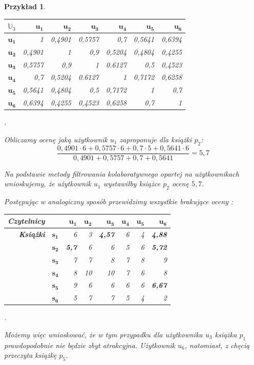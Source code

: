 \documentclass[12pt,a4paper]{report}
\newtheorem{przyklad}{Przykład}[chapter]
\begin{document}
\begin{przyklad}
\begin{center}
\begin{tabular}{|r|r|r|r|r|r|r|}
$\mathbb{U}_3$ & $\mathbf{u_1}$ & $\mathbf{u_2}$ & $\mathbf{u_3}$ & $\mathbf{u_4}$ & $\mathbf{u_5}$ & $\mathbf{u_6}$ \\
\hline
$\mathbf{u_1}$ & 1 & 0,4901 & 0,5757 & 0,7 & 0,5641 & 0,6394 \\
\hline
$\mathbf{u_2}$ & 0,4901 & 1 & 0,9 & 0,5204 & 0,4804 & 0,4255 \\
\hline
$\mathbf{u_3}$ & 0,5757 & 0,9 & 1 & 0.6127 & 0,5 & 0,4523 \\
\hline
$\mathbf{u_4}$ & 0,7 & 0,5204 & 0.6127 & 1 & 0,7172 & 0,6258 \\ 
\hline 
$\mathbf{u_5}$ & 0,5641 & 0,4804 & 0,5 & 0,7172 & 1 & 0,7 \\
\hline 
$\mathbf{u_6}$ & 0,6394 & 0,4255 & 0,4523 & 0,6258 & 0,7 & 1 \\ 
\hline 
\end{tabular}.
\end{center}
Obliczamy ocenę jaką użytkownik $u_1$ zaproponuje dla książki $p_2$:
$$
\frac{0,4901 \cdot 6 + 0,5757 \cdot 6 + 0,7 \cdot 5 + 0,5641 \cdot 6}{0,4901 + 0,5757  + 0,7  + 0,5641} = 5,7
$$

Na podstawie metody filtrowania kolaboratywnego opartej na użytkownikach wnioskujemy, że użytkownik $u_1$ wystawiłby książce $p_2$ ocenę $5,7$.

Postępując w analogiczny sposób przewidzimy wszystkie brakujące oceny :
\begin{center}
\begin{tabular}{|r|r|r|r|r|r|r|r|} \hline
\textbf{Czytelnicy} & & $\mathbf{u_1}$ & $\mathbf{u_2}$ & $\mathbf{u_3}$ & $\mathbf{u_4}$ & $\mathbf{u_5}$ & $\mathbf{u_6}$ \\
\hline
\hline
\textbf{Książki} &$\mathbf{s_1}$ & 6 & 3 & \textbf{4,57} & 6 & 4 & \textbf{4,88} \\
\hline
&$\mathbf{s_2}$ & \textbf{5,7} & 6 & 6 & 5 & 6 & \textbf{5,72} \\
\hline
&$\mathbf{s_3}$ & 7 & 7 & 8 & 7 & 8 & 9 \\
\hline
&$\mathbf{s_4}$ & 8 & 10 & 10 & 7 & 6 & 8 \\
\hline
&$\mathbf{s_5}$ & 9 & 6 & 6 & 6 & 6 & \textbf{6,67}  \\
\hline
&$\mathbf{s_6}$ & 5 & 7 & 7 & 5 & 4 & 2 \\
\hline
\end{tabular}.
\end{center}
Możemy więc wnioskować, że w tym przypadku dla użytkownika $u_3$ książka $p_1$ prawdopodobnie nie będzie zbyt atrakcyjna. Użytkownik $u_6$, natomiast, z chęcią przeczyta książkę $p_5$. 
\end{przyklad}
\end{document}

